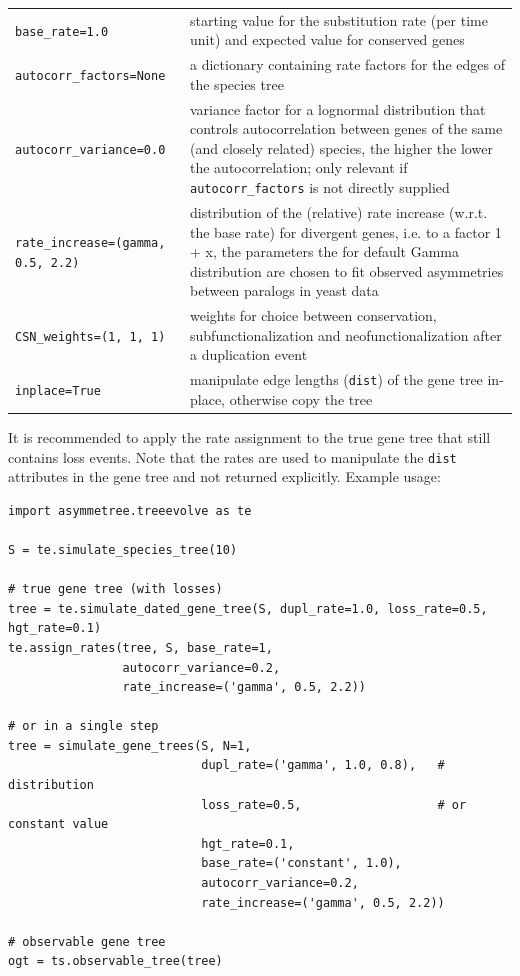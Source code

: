 \documentclass[hidelinks,11pt]{article}
\newcommand{\sq}{\textquotesingle}
\begin{document}
\vspace{3mm}
{\small\centering
\begin{longtable}{ p{4.0cm} p{9cm} }
	\texttt{base\_rate=1.0} & starting value for the substitution rate (per time unit) and expected value for conserved genes\\
	\texttt{autocorr\_factors=None}  & a dictionary containing rate factors for the edges of the species tree\\
	\texttt{autocorr\_variance=0.0}  & variance factor for a lognormal distribution that controls autocorrelation between genes of the same (and closely related) species, the higher the lower the auto\-corre\-la\-tion; only relevant if \texttt{autocorr\_factors} is not directly supplied\\
	\texttt{rate\_increase=\newline (\sq gamma\sq, 0.5, 2.2)}  & distribution of
	the (relative) rate increase (w.r.t. the
  base rate) for divergent genes, i.e. to a factor 1 + x, the parameters the
  for default Gamma distribution are chosen to fit observed asymmetries between
  paralogs in yeast data \citep{byrne2007}\\
	\texttt{CSN\_weights=(1, 1, 1)}  & weights for choice between conservation,
	subfunctionalization and neofunctionalization after a duplication event\\
	\texttt{inplace=True}  & manipulate edge lengths (\texttt{dist}) of the gene tree in-place, otherwise copy the tree\\
\end{longtable}
}
\vspace{3mm}

\noindent
It is recommended to apply the rate assignment to the true gene tree that still contains loss events.
Note that the rates are used to manipulate the \texttt{dist} attributes in the gene tree and not returned explicitly.
Example usage:
\begin{adjustwidth}{1cm}{1cm}\vspace{2mm}
\begin{verbatim}
import asymmetree.treeevolve as te

S = te.simulate_species_tree(10)

# true gene tree (with losses)
tree = te.simulate_dated_gene_tree(S, dupl_rate=1.0, loss_rate=0.5, hgt_rate=0.1)
te.assign_rates(tree, S, base_rate=1,
                autocorr_variance=0.2,
                rate_increase=('gamma', 0.5, 2.2))

# or in a single step
tree = simulate_gene_trees(S, N=1,
                           dupl_rate=('gamma', 1.0, 0.8),   # distribution
                           loss_rate=0.5,                   # or constant value
                           hgt_rate=0.1,
                           base_rate=('constant', 1.0),
                           autocorr_variance=0.2,
                           rate_increase=('gamma', 0.5, 2.2))

# observable gene tree
ogt = ts.observable_tree(tree)
\end{verbatim}
\end{adjustwidth}
\end{document}
